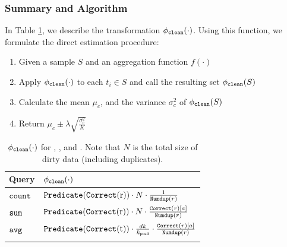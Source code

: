 \subsubsection{Summary and Algorithm}
In Table \ref{tbl:transform-new}, we describe the transformation $\phi_{\texttt{clean} } (\cdot)$.
Using this function, we formulate the direct estimation procedure:

\begin{enumerate}
\item Given a sample $S$ and an aggregation function $f(\cdot)$\vspace{-.5em}
\item Apply $\phi_{\texttt{clean} } (\cdot)$ to each $t_i \in S$ and call the resulting set $\phi_{\texttt{clean} } (S)$\vspace{-.5em}
\item Calculate the mean $\mu_c$, and the variance $\sigma_c^2$ of $\phi_{\texttt{clean} } (S)$\vspace{-.5em}
\item Return $\mu_c \pm \lambda \sqrt{\frac{\sigma_c^2}{K}}$\vspace{-.5em}
\end{enumerate}

\begin{table}[tup]\vspace{-1em}

\small
\caption{$\phi_{\texttt{clean} } (\cdot)$ for \countfunc, \sumfunc, and \avgfunc. Note that $N$ is the total size of dirty data (including duplicates).}
\centering 
\begin{tabular}{l l}
\hline\hline
Query & $\phi_{\texttt{clean} } (\cdot)$\\
\hline  %
\vspace{.5em}
$\texttt{count}$ & $
		\Predicatec{r}\cdot N\cdot\frac{1}{\Dedup{r}{R}}
$ \\\vspace{.5em} %
$\texttt{sum} $ & $
		\Predicatec{r}\cdot N\cdot\frac{\Correct{r}[a]}{\Dedup{r}{R}}
$ \\\vspace{.5em}
$\texttt{avg} $ & $
		\Predicatec{t}\cdot \frac{dk}{k_{\pred}}\cdot\frac{\Correct{r}[a]}{\Dedup{r}{R}}
$ \\ [1ex] %
\hline %
\label{tbl:transform-new}
\end{tabular}\vspace{-2em}
\end{table}

